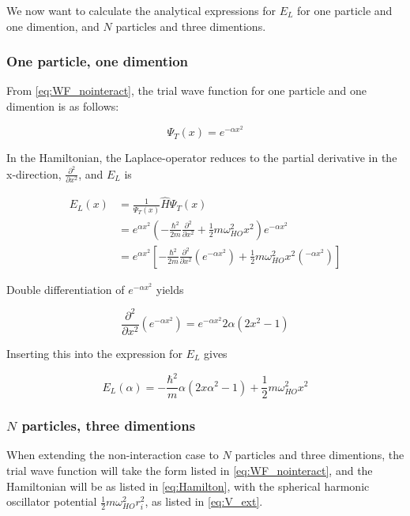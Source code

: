 \documentclass[norsk,a4paper,12pt]{article}
\begin{document}
We now want to calculate the analytical expressions for $E_L$ for one particle and one dimention, and $N$ particles and three dimentions.

\subsubsection{One particle, one dimention}

From \ref{eq:WF_nointeract}, the trial wave function for one particle and one dimention is as follows:

\begin{equation}
	\Psi_T(x) = e^{-\alpha x^2} 
\end{equation}

In the Hamiltonian, the Laplace-operator reduces to the partial derivative in the x-direction, $\frac{\partial^2 }{\partial x^2}$, and $E_L$ is 

\begin{equation}
\begin{aligned}
E_L(x) &=  \frac{1}{\Psi_T(x)}\hat{H}\Psi_T(x) \\ 
			 & =  e^{\alpha x^2} (-\frac{\hbar^2}{2m}\frac{\partial^2 }{\partial x^2} + \frac{1}{2} m \omega_{HO}^2 x^2) e^{-\alpha x^2}  \\
			 & = e^{\alpha x^2} [-\frac{\hbar^2}{2m}\frac{\partial^2 }{\partial x^2} (e^{-\alpha x^2}) + \frac{1}{2} m \omega_{HO}^2 x^2 (^{-\alpha x^2})]
\end{aligned}
\end{equation}

Double differentiation of $ e^{-\alpha x^2}$ yields

\begin{equation}
\frac{\partial^2}{\partial x^2} (e^{-\alpha x^2}) = e^{-\alpha x^2} 2 \alpha (2x^2 -1)
\end{equation}

Inserting this into the expression for $E_L$ gives

\begin{equation}
E_L(\alpha) = -\frac{\hbar^2}{m} \alpha (2x\alpha^2 -1) + \frac{1}{2} m\omega_{HO}^2x^2
\end{equation}

\subsubsection{$N$ particles, three dimentions}

When extending the non-interaction case to $N$ particles and three dimentions, the trial wave function will take the form listed in \ref{eq:WF_nointeract}, and the Hamiltonian will be as listed in \ref{eq:Hamilton}, with the spherical harmonic oscillator potential $\frac{1}{2}m\omega_{HO}^2r_i^2$, as listed in \ref{eq:V_ext}.
\end{document}
